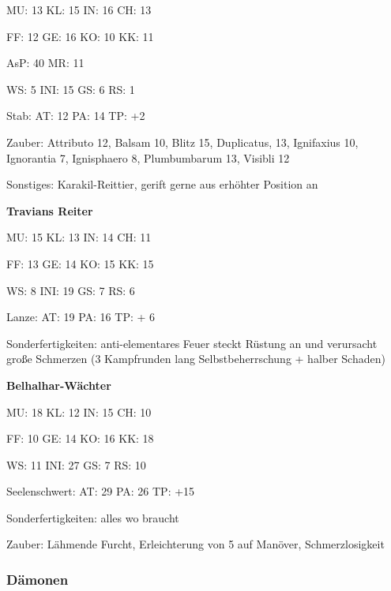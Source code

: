 {MU: 13 \quad KL: 15 \quad IN: 16 \quad CH: 13

FF: 12 \quad GE: 16 \quad KO: 10 \quad KK: 11

AsP: 40 \quad MR: 11

WS: 5 \quad  INI: 15 \quad GS: 6 \quad RS: 1

Stab: \quad  AT: 12 \quad PA: 14  \quad  TP: +2

Zauber: Attributo 12, Balsam 10, Blitz 15, Duplicatus, 13, Ignifaxius 10, Ignorantia 7, Ignisphaero 8, Plumbumbarum 13, Visibli 12

Sonstiges: Karakil-Reittier, gerift gerne aus erhöhter Position an \par\bigskip


\textbf{Travians Reiter}

MU: 15 \quad KL: 13 \quad IN: 14 \quad CH: 11

FF: 13 \quad GE: 14 \quad KO: 15 \quad KK: 15

WS: 8 \quad INI: 19 \quad GS: 7 \quad RS: 6

Lanze: AT: 19 \quad PA: 16 \quad TP: + 6

Sonderfertigkeiten: anti-elementares Feuer steckt Rüstung an und verursacht große Schmerzen (3 Kampfrunden lang Selbstbeherrschung + halber Schaden)\par\bigskip

\textbf{Belhalhar-Wächter}

MU: 18 \quad KL: 12 \quad IN: 15 \quad CH: 10

FF: 10 \quad GE: 14 \quad KO: 16 \quad KK: 18

WS: 11 \quad INI: 27 \quad GS: 7 \quad RS: 10

Seelenschwert: AT: 29 PA: 26 TP: +15

Sonderfertigkeiten: alles wo braucht

Zauber: Lähmende Furcht, Erleichterung von 5 auf Manöver, Schmerzlosigkeit\par\bigskip }

\newpage
\subsubsection{Dämonen}


